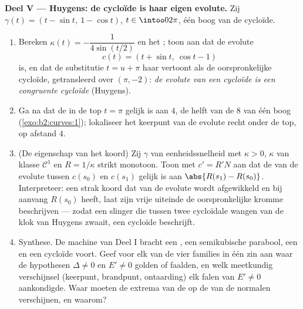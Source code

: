\begin{problem}
\medskip
\noindent\textbf{Deel V --- Huygens: de cycloïde is haar eigen
evolute.} Zij $\gamma(t) = (t - \sin t,\ 1 - \cos t)$, $t \in
\intoo0{2\pi}$, één boog van de cycloïde.
\begin{enumerate}[resume]
  \item Bereken $\kappa(t) = -\dfrac1{4\sin(t/2)}$ en het
        ; toon aan dat de evolute
        \[
        c(t) = (t + \sin t,\ \cos t - 1)
        \]
        is, en dat de substitutie $t = u + \pi$ haar vertoont als
        de oorspronkelijke cycloïde, getransleerd over $(\pi,
        -2)$: \emph{de evolute van een cycloïde is een congruente
        cycloïde} (Huygens).
  \item Ga na dat de  in de top $t = \pi$ gelijk is aan
        $4$, de helft van de  $8$ van één boog
        (\cref{exo:b2:curves:1}); lokaliseer het keerpunt van de
        evolute recht onder de top, op afstand $4$.
  \item (De eigenschap van het koord) Zij $\gamma$ van
        eenheidssnelheid met $\kappa > 0$, $\kappa$ van klasse
        $\mathcal C^1$ en $R = 1/\kappa$ strikt monotoon. Toon met
        $c' = R'N$ aan dat de  van de evolute tussen
        $c(s_0)$ en $c(s_1)$ gelijk is aan $\abs{R(s_1) -
        R(s_0)}$. Interpreteer: een strak koord dat van de evolute
        wordt afgewikkeld en bij aanvang  $R(s_0)$ heeft,
        laat zijn vrije uiteinde de oorspronkelijke kromme
        beschrijven --- zodat een slinger die tussen twee
        cycloïdale wangen van de klok van Huygens zwaait, een
        cycloïde beschrijft.
  \item Synthese. De machine van Deel I bracht een , een
        semikubische parabool, een  en een cycloïde voort.
        Geef voor elk van de vier families in één zin aan waar de
        hypothesen $\Delta \neq 0$ en $E' \neq 0$ golden of
        faalden, en welk meetkundig verschijnsel (keerpunt,
        brandpunt, ontaarding) elk falen van $E' \neq 0$
        aankondigde. Waar moeten de extrema van de  op de
         van de normalen verschijnen, en waarom?
\end{enumerate}
\end{problem}
